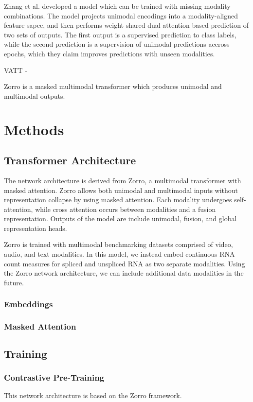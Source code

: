\documentclass{article} %
\begin{document}
Zhang et al. developed a model which can be trained with missing modality combinations. The model projects unimodal encodings into a modality-aligned feature sapce, and then performs weight-shared dual attention-based prediction of two sets of outputs. The first output is a supervised prediction to class labels, while the second prediction is a supervision of unimodal predictions accross epochs, which they claim improves predictions with unseen modalities.

VATT - 

Zorro is a masked multimodal transformer which produces unimodal and multimodal outputs.


  \section{Methods}
  \subsection{Transformer Architecture}
The network architecture is derived from Zorro, a multimodal transformer with masked attention. Zorro allows both unimodal and multimodal inputs without representation collapse by using masked attention. Each modality undergoes self-attention, while cross attention occurs between modalities and a fusion representation. Outputs of the model are include unimodal, fusion, and global representation heads.

Zorro is trained with multimodal benchmarking datasets comprised of video, audio, and text modalities. In this model, we instead embed continuous RNA count measures for spliced and unspliced RNA as two separate modalities. Using the Zorro network architecture, we can include additional data modalities in the future.

  \subsubsection{Embeddings}

\subsubsection{Masked Attention}
\subsection{Training}
 \subsubsection{Contrastive Pre-Training}
 This network architecture is based on the Zorro framework. 
\end{document}

